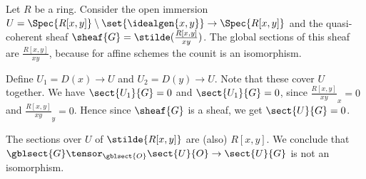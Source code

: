\begin{example}
Let $R$ be a ring.
Consider the open immersion $U = \Spec{R[x,y]} \setminus \set{\idealgen{x,y}} \rightarrow \Spec{R[x,y]}$
and the quasi-coherent sheaf $\sheaf{G} = \stilde(\frac{R[x,y]}{xy})$.
The global sections of this sheaf are $\frac{R[x,y]}{xy}$, because for affine schemes the counit is an isomorphism.

Define $U_1 = D(x) \rightarrow U$ and $U_2 = D(y) \rightarrow U$. 
Note that these cover $U$ together.
We have $\sect{U_1}{G} = 0$ and $\sect{U_1}{G} = 0$, since $\frac{R[x,y]}{xy}_x = 0$ and $\frac{R[x,y]}{xy}_y = 0$.
Hence since $\sheaf{G}$ is a sheaf, we get $\sect{U}{G} = 0$.%

The sections over $U$ of $\stilde{R[x,y]}$ are (also) $R[x,y]$. %
We conclude that $\gblsect{G} \tensor_{\gblsect{O}} \sect{U}{O} \rightarrow \sect{U}{G}$
is not an isomorphism.
\end{example}
